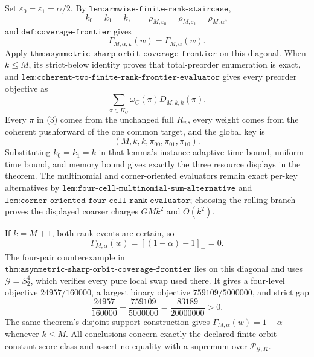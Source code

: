 Set \(\varepsilon_0=\varepsilon_1=\alpha/2\). By \(\texttt{lem:armwise-finite-rank-staircase}\),
\[
k_0=k_1=k,\qquad \rho_{M,\varepsilon_0}=\rho_{M,\varepsilon_1}=\rho_{M,\alpha},
\tag{1}
\]
and \(\texttt{def:coverage-frontier}\) gives
\[
\Gamma_{M,\alpha,\boldsymbol\varepsilon}(w)=\Gamma_{M,\alpha}(w).
\tag{2}
\]
Apply \(\texttt{thm:asymmetric-sharp-orbit-coverage-frontier}\) on this diagonal. When \(k\le M\), its strict-below identity proves that total-preorder enumeration is exact, and \(\texttt{lem:coherent-two-finite-rank-frontier-evaluator}\) gives every preorder objective as
\[
\sum_{\pi\in\Pi_C}\omega_C(\pi)D_{M,k,k}(\pi).
\tag{3}
\]
Every \(\pi\) in (3) comes from the unchanged full \(R_w\), every weight comes from the coherent pushforward of the one common target, and the global key is
\[
(M,k,k,\pi_{00},\pi_{01},\pi_{10}).
\tag{4}
\]
Substituting \(k_0=k_1=k\) in that lemma's instance-adaptive time bound, uniform time bound, and memory bound gives exactly the three resource displays in the theorem. The multinomial and corner-oriented evaluators remain exact per-key alternatives by \(\texttt{lem:four-cell-multinomial-sum-alternative}\) and \(\texttt{lem:corner-oriented-four-cell-rank-evaluator}\); choosing the rolling branch proves the displayed coarser charges \(GMk^2\) and \(O(k^2)\).

If \(k=M+1\), both rank events are certain, so
\[
\Gamma_{M,\alpha}(w)=[(1-\alpha)-1]_+=0.
\tag{5}
\]
The four-pair counterexample in \(\texttt{thm:asymmetric-sharp-orbit-coverage-frontier}\) lies on this diagonal and uses \(\mathcal G=S_2^4\), which verifies every pure local swap used there. It gives a four-level objective \(24957/160000\), a largest binary objective \(759109/5000000\), and strict gap
\[
\frac{24957}{160000}-\frac{759109}{5000000}=\frac{83189}{20000000}>0.
\tag{6}
\]
The same theorem's disjoint-support construction gives \(\Gamma_{M,\alpha}(w)=1-\alpha\) whenever \(k\le M\). All conclusions concern exactly the declared finite orbit-constant score class and assert no equality with a supremum over \(\mathcal P_{\mathcal G,K}\).